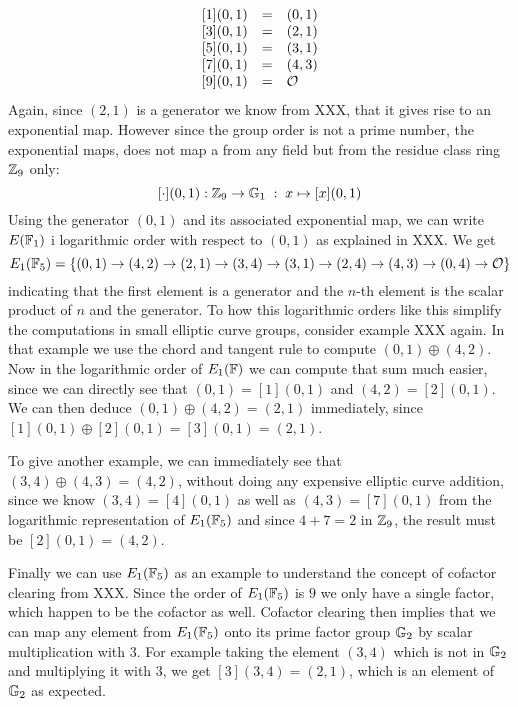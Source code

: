 \begin{example}
$$\begin{array}{lccr}
{}\begin{array}{lcl}
{}[1](0,1) &=& (0, 1) \\
{}[3](0,1) &=& (2, 1) \\
{}[5](0,1) &=& (3, 1) \\
{}[7](0,1) &=& (4, 3) \\
{}[9](0,1) &=& \mathcal{O}
\end{array}
\end{array}
$$
Again, since $(2,1)$ is a generator we know from XXX, that it gives rise to an exponential map. However since the group order is not a prime number, the exponential maps, does not map a from any field but from the residue class ring $\mathbb{Z}_9$ only:
$$
[\cdot](0,1): \mathbb{Z}_9 \to \mathbb{G}_1\; : \; x\mapsto [x](0,1)
$$
Using the generator $(0,1)$ and its associated exponential map, we can write $E(\mathbb{F}_1)$ i logarithmic order with respect to $(0,1)$ as explained in XXX. We get
$$
E_1(\mathbb{F}_5) = \{(0, 1)\to (4, 2)\to (2, 1)\to (3, 4)\to (3, 1)\to (2, 4)\to (4, 3)\to (0, 4)\to \mathcal{O} \}
$$
indicating that the first element is a generator and the $n$-th element is the scalar product of $n$ and the generator. To how this logarithmic orders like this simplify the computations in small elliptic curve groups, consider example XXX again. In that example we use the chord and tangent rule to compute $(0,1)\oplus (4,2)$. Now in the logarithmic order of $E_1(\mathbb{F})$ we can compute that sum much easier, since we can directly see that $(0,1)=[1](0,1)$ and $(4,2)=[2](0,1)$. We can then deduce $(0,1)\oplus (4,2)= (2,1)$ immediately, since $[1](0,1)\oplus [2](0,1)= [3](0,1)=(2,1)$.

To give another example, we can immediately see that $(3,4)\oplus (4,3) = (4,2)$, without doing any expensive elliptic curve addition, since we know $(3,4)= [4](0,1)$ as well as $(4,3)= [7](0,1)$ from the logarithmic representation of $E_1(\mathbb{F}_5)$ and since $4+7 = 2$ in $\mathbb{Z}_9$, the result must be $[2](0,1)=(4,2)$.

Finally we can use $E_1(\mathbb{F}_5)$ as an example to understand the concept of cofactor clearing from XXX. Since the order of $E_1(\mathbb{F}_5)$ is $9$ we only have a single factor, which happen to be the cofactor as well. Cofactor clearing then implies that we can map any element from $E_1(\mathbb{F}_5)$ onto its prime factor group $\mathbb{G}_2$ by scalar multiplication with $3$. For example taking the element $(3,4)$ which is not in $\mathbb{G}_2$ and multiplying it with $3$, we get $[3](3,4)= (2,1)$, which is an element of $\mathbb{G}_2$ as expected.
\end{example}
